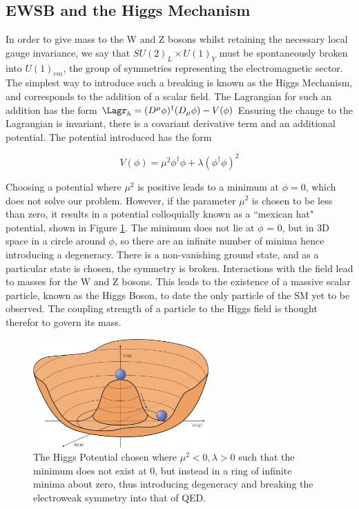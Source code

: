 \subsection{EWSB and the Higgs Mechanism}

In order to give mass to the W and Z bosons whilst retaining the necessary local gauge invariance, we say that $SU(2)_{L} \times U(1)_{Y}$ must be spontaneously broken into $U(1)_{em}$, the group of symmetries representing the electromagnetic sector. The simplest way to introduce such a breaking is known as the Higgs Mechanism, and corresponds to the addition of a scalar field. The Lagrangian for such an addition has the form $\Lagr_{h} = (D^{\mu}\phi)^{\dagger}(D_{\mu}\phi) - V(\phi)$  Ensuring the change to the Lagrangian is invariant, there is a covariant derivative term and an additional potential. The potential introduced has the form 

\begin{equation}
V(\phi) = \mu^{2}\phi^{\dagger}\phi + \lambda (\phi^{\dagger}\phi)^{2}
\end{equation}

Choosing a potential where $\mu^{2}$ is positive leads to a minimum at $\phi = 0$, which does not solve our problem. However, if the parameter $\mu^{2}$ is chosen to be less than zero, it results in a potential colloquially known as a ``mexican hat" potential, shown in Figure \ref{fig:MexicanHat}. The minimum does not lie at $\phi$ = 0, but in 3D space in a circle around $\phi$, so there are an infinite number of minima hence introducing a degeneracy. There is a non-vanishing ground state, and as a particular state is chosen, the symmetry is broken. Interactions with the field lead to masses for the W and Z bosons. This leads to the existence of a massive scalar particle, known as the Higgs Boson, to date the only particle of the SM yet to be observed. The coupling strength of a particle to the Higgs field is thought therefor to govern its mass.

\begin{figure}
\centering
\includegraphics[width=0.6\textwidth]{Figures/Theory/MHat}
\caption{\label{fig:MexicanHat}The Higgs Potential chosen where $\mu^{2} < 0, \lambda > 0$ such that the minimum does not exist at 0, but instead in a ring of infinite minima about zero, thus introducing degeneracy and breaking the electroweak symmetry into that of QED.~\cite{MexHat}}
\end{figure}

